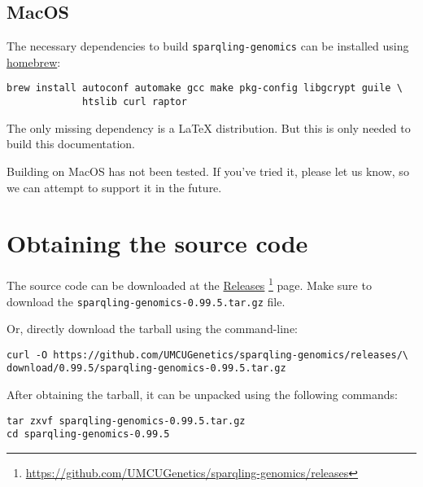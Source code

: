 \subsection{MacOS}

  The necessary dependencies to build \texttt{sparqling-genomics} can be
  installed using \href{https://brew.sh/}{homebrew}:

\begin{siderules}
\begin{verbatim}
brew install autoconf automake gcc make pkg-config libgcrypt guile \
             htslib curl raptor
\end{verbatim}
\end{siderules}

  The only missing dependency is a \LaTeX{} distribution.  But this is
  only needed to build this documentation.

  Building on MacOS has not been tested.  If you've tried it, please let
  us know, so we can attempt to support it in the future.

\section{Obtaining the source code}
\label{sec:obtaining-tarball}

  \begin{sloppypar}
  The source code can be downloaded at the
  \href{https://github.com/UMCUGenetics/sparqling-genomics/releases}%
  {Releases}%
  \footnote{\url{https://github.com/UMCUGenetics/sparqling-genomics/releases}}
  page.  Make sure to download the \mbox{\texttt{sparqling-genomics-0.99.5.tar.gz}}
  file.
  \end{sloppypar}

  Or, directly download the tarball using the command-line:
\begin{siderules}
\begin{verbatim}
curl -O https://github.com/UMCUGenetics/sparqling-genomics/releases/\
download/0.99.5/sparqling-genomics-0.99.5.tar.gz
\end{verbatim}
\end{siderules}

  After obtaining the tarball, it can be unpacked using the following commands:

\begin{siderules}
\begin{verbatim}
tar zxvf sparqling-genomics-0.99.5.tar.gz
cd sparqling-genomics-0.99.5
\end{verbatim}
\end{siderules}

